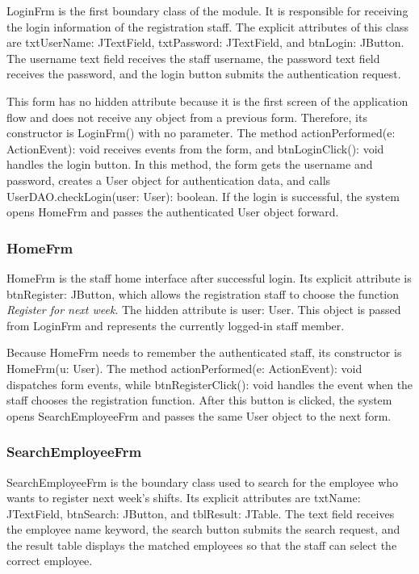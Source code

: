 LoginFrm is the first boundary class of the module. It is responsible for receiving the login information of the registration staff. The explicit attributes of this class are txtUserName: JTextField, txtPassword: JTextField, and btnLogin: JButton. The username text field receives the staff username, the password text field receives the password, and the login button submits the authentication request.

This form has no hidden attribute because it is the first screen of the application flow and does not receive any object from a previous form. Therefore, its constructor is LoginFrm() with no parameter. The method actionPerformed(e: ActionEvent): void receives events from the form, and btnLoginClick(): void handles the login button. In this method, the form gets the username and password, creates a User object for authentication data, and calls UserDAO.checkLogin(user: User): boolean. If the login is successful, the system opens HomeFrm and passes the authenticated User object forward.

\subsubsection{HomeFrm}

HomeFrm is the staff home interface after successful login. Its explicit attribute is btnRegister: JButton, which allows the registration staff to choose the function \textit{Register for next week}. The hidden attribute is user: User. This object is passed from LoginFrm and represents the currently logged-in staff member.

Because HomeFrm needs to remember the authenticated staff, its constructor is HomeFrm(u: User). The method actionPerformed(e: ActionEvent): void dispatches form events, while btnRegisterClick(): void handles the event when the staff chooses the registration function. After this button is clicked, the system opens SearchEmployeeFrm and passes the same User object to the next form.

\subsubsection{SearchEmployeeFrm}

SearchEmployeeFrm is the boundary class used to search for the employee who wants to register next week's shifts. Its explicit attributes are txtName: JTextField, btnSearch: JButton, and tblResult: JTable. The text field receives the employee name keyword, the search button submits the search request, and the result table displays the matched employees so that the staff can select the correct employee.


